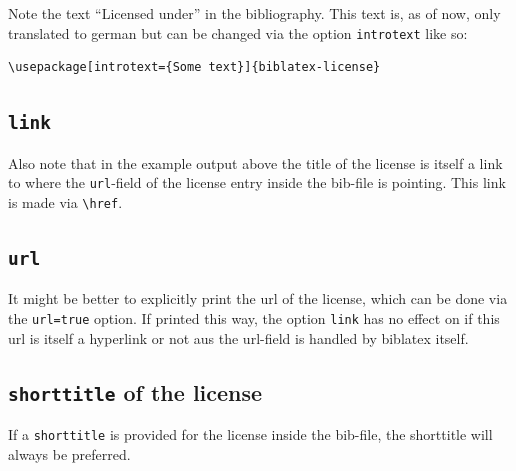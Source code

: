 \documentclass[11pt,oneside,notitlepage,a4paper,english,parskip=half*] {scrartcl}
\begin{document}
Note the text \enquote{Licensed under} in the bibliography. This text is, as of now, only translated to german but can be changed via the option \texttt{introtext} like so:
\begin{verbatim}
\usepackage[introtext={Some text}]{biblatex-license}
\end{verbatim}

\subsection{\texttt{link}}

Also note that in the example output above the title of the license is itself a link to where the \texttt{url}-field of the license entry inside the bib-file is pointing. This link is made via \verb|\href|.

\subsection{\texttt{url}}

It might be better to explicitly print the url of the license, which can be done via the \texttt{url=true} option. If printed this way, the option \texttt{link} has no effect on if this url is itself a hyperlink or not aus the url-field is handled by biblatex itself.

\subsection{\texttt{shorttitle} of the license}

If a \texttt{shorttitle} is provided for the license inside the bib-file, the shorttitle will always be preferred. 
\end{document}
